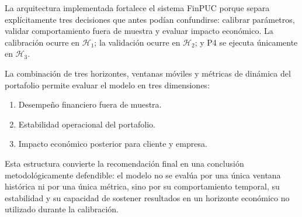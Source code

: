 \documentclass[11pt]{article}
\begin{document}
La arquitectura implementada fortalece el sistema FinPUC porque separa expl\'icitamente tres decisiones que antes pod\'ian confundirse: calibrar par\'ametros, validar comportamiento fuera de muestra y evaluar impacto econ\'omico. La calibraci\'on ocurre en $\mathcal{H}_1$; la validaci\'on ocurre en $\mathcal{H}_2$; y P4 se ejecuta \'unicamente en $\mathcal{H}_3$.

La combinaci\'on de tres horizontes, ventanas m\'oviles y m\'etricas de din\'amica del portafolio permite evaluar el modelo en tres dimensiones:

\begin{enumerate}
    \item Desempe\~no financiero fuera de muestra.
    \item Estabilidad operacional del portafolio.
    \item Impacto econ\'omico posterior para cliente y empresa.
\end{enumerate}

Esta estructura convierte la recomendaci\'on final en una conclusi\'on metodol\'ogicamente defendible: el modelo no se eval\'ua por una \'unica ventana hist\'orica ni por una \'unica m\'etrica, sino por su comportamiento temporal, su estabilidad y su capacidad de sostener resultados en un horizonte econ\'omico no utilizado durante la calibraci\'on.
\end{document}
